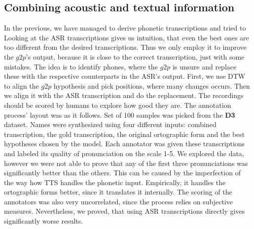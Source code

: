 \subsection{Combining acoustic and textual information}
In the previous, we have managed to derive phonetic transcriptions and tried to 
Looking at the ASR transcriptions gives us intuition, that even the best ones are too different from the desired transcriptions.
Thus we only employ it to improve the $g2p$'s output, because it is close to the correct transcription, just with some mistakes.
The idea is to identify phones, where the $g2p$ is unsure and replace these with the respective counterparts in the ASR's output.
First, we use DTW to align the $g2p$ hypothesis and pick positions, where many changes occurs.
Then we align it with the ASR transcription and do the replacement.
\linebreak \linebreak
The recordings should be scored by humans to explore how good they are. The annotation process' layout was as it follows. Set of 100 samples was picked from the \textbf{D3} dataset. Names were synthesized using four different inputs: combined transcription, the gold transcription, the original ortographic form and the best hypotheses chosen by the model. Each annotator was given these  transcriptions and labeled its quality of pronunciation on the scale 1-5. We explored the data, however we were not able to prove that any of the first three pronunciations was significantly better than the others.
This can be caused by the imperfection of the way how TTS handles the phonetic input.
Empirically, it handles the ortographic forms better, since it translates it internally.
The scoring of the annotators was also very uncorrelated, since the process relies on subjective measures.
Nevertheless, we proved, that using ASR transcriptions directly gives significantly worse results.